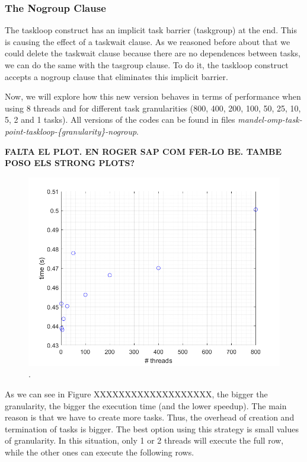\documentclass[12pt, a4paper]{article}
\begin{document}
\subsubsection{The Nogroup Clause}

The taskloop construct has an implicit task barrier (taskgroup) at the end. This is causing the effect of a taskwait clause. As we reasoned before about that we could delete the taskwait clause because there are no dependences between tasks, we can do the same with the tasgroup clause. To do it, the taskloop construct accepts a nogroup clause that eliminates this implicit barrier.

Now, we will explore how this new version behaves in terms of performance when using 8 threads and for different task granularities (800, 400, 200, 100, 50, 25, 10, 5, 2 and 1 tasks). All versions of the codes can be found in files \textit{mandel-omp-task-point-taskloop-\{granularity\}-nogroup}.

\textbf{\large{\large{FALTA EL PLOT. EN ROGER SAP COM FER-LO BE. TAMBE POSO ELS STRONG PLOTS?}}}

\begin{figure}[H]
  \centering
  \includegraphics[scale=0.5]{./num_task_point}
  \caption{.}
  \label{fig:num_task_point}
\end{figure}

As we can see in Figure XXXXXXXXXXXXXXXXXXX, the bigger the granularity, the bigger the execution time (and the lower speedup). The main reason is that we have to create more tasks. Thus, the overhead of creation and termination of tasks is bigger. The best option using this strategy is small values of granularity. In this situation, only 1 or 2 threads will execute the full row, while the other ones can execute the following rows.
\end{document}
